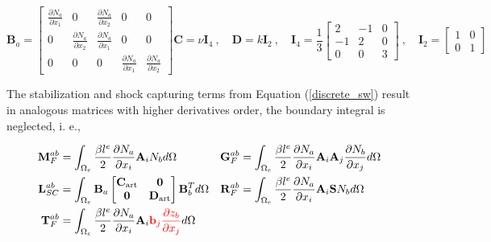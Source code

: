 \documentclass[a4paper,12pt]{elsarticle}
\newcommand{\Miguel}[1]{\textcolor{red}{#1}}
\newcommand{\pder}[2]{\frac{\partial#1}{\partial#2}}
\begin{document}
\begin{subequations}
\begin{equation}
\mathbf{B}_a = \left[\begin{matrix}
    \pder{N_a}{x_1} & 0 & \pder{N_a}{x_2} & 0 & 0 \\
    0 & \pder{N_a}{x_2} & \pder{N_a}{x_1} & 0 & 0 \\
    0 & 0 & 0 & \pder{N_a}{x_1} & \pder{N_a}{x_2}
\end{matrix}\right]
\end{equation}
\begin{equation}
\mathbf{C} = \nu \mathbf{I}_4 \ , \quad
\mathbf{D} = k \mathbf{I}_2 \ , \quad
\mathbf{I}_4 = \frac{1}{3} \left[\begin{matrix}
        2 & -1 & 0 \\
        -1 & 2 & 0 \\
        0 & 0 & 3
    \end{matrix}\right] \ , \quad
\mathbf{I}_2 = \left[\begin{matrix}
        1 & 0 \\
        0 & 1
    \end{matrix}\right]
\end{equation}
\end{subequations}

The stabilization and shock capturing terms from Equation (\ref{discrete_sw}) result in analogous matrices with higher derivatives order, the boundary integral is neglected, i. e.,

\begin{align}
\displaystyle\mathbf{M}_F^{ab} &= \int_{\Omega_e} \frac{\beta l^e}{2} \pder{N_a}{x_i}\mathbf{A}_i N_b d\Omega &
\displaystyle\mathbf{G}_F^{ab} &= \int_{\Omega_e} \frac{\beta l^e}{2} \pder{N_a}{x_i}\mathbf{A}_i\mathbf{A}_j \pder{N_b}{x_j} d\Omega \nonumber\\
\displaystyle\mathbf{L}_{SC}^{ab} &= \int_{\Omega_e} \mathbf{B}_a \left[\begin{matrix}
        \mathbf{C}_\text{art} & \mathbf{0} \\ \mathbf{0} & \mathbf{D}_\text{art}
    \end{matrix}\right] \mathbf{B}_b^T d\Omega &
\displaystyle\mathbf{R}_F^{ab} &= \int_{\Omega_e} \frac{\beta l^e}{2} \pder{N_a}{x_i}\mathbf{A}_i \mathbf{S} N_b d\Omega \\
\displaystyle\mathbf{T}_F^{ab} &= \int_{\Omega_e} \frac{\beta l^e}{2} \pder{N_a}{x_i}\mathbf{A}_i \Miguel{\mathbf{b}_j \pder{z_b}{x_j}} d\Omega
\nonumber
\end{align}
\end{document}

